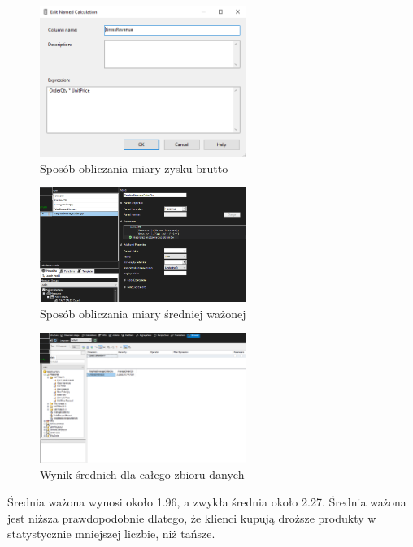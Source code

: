 \documentclass[a4paper,12pt]{article}
\begin{document}
\begin{figure}[H]
  \centering
  \includegraphics[width=0.6\textwidth]{3_gross_revenue.png}
  \caption{Sposób obliczania miary zysku brutto}
\end{figure}

\begin{figure}[H]
  \centering
  \includegraphics[width=0.6\textwidth]{3_calculations_2.png}
  \caption{Sposób obliczania miary średniej ważonej}
\end{figure}

\begin{figure}[H]
  \centering
  \includegraphics[width=0.6\textwidth]{3_result.png}
  \caption{Wynik średnich dla całego zbioru danych}
\end{figure}

Średnia ważona wynosi około 1.96, a zwykła średnia około 2.27. Średnia ważona jest niższa prawdopodobnie dlatego, że klienci kupują droższe produkty w statystycznie mniejszej liczbie, niż tańsze.
\end{document}
